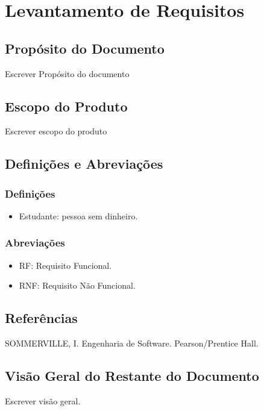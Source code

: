 \section{Levantamento de Requisitos}\label{requisitos}

\subsection{Propósito do Documento}
Escrever Propósito do documento



\subsection{Escopo do Produto}
Escrever escopo do produto



\subsection{Definições e Abreviações}
	\subsubsection{Definições}
	\begin{itemize}
	\item[] Estudante: pessoa sem dinheiro.
	\end{itemize}

	\subsubsection{Abreviações}
	\begin{itemize}
	\item[] RF: Requisito Funcional.
	\item[] RNF: Requisito Não Funcional.
	\end{itemize}



\subsection{Referências}
SOMMERVILLE, I. Engenharia de Software. Pearson/Prentice Hall.



\subsection{Visão Geral do Restante do Documento}
Escrever visão geral.



